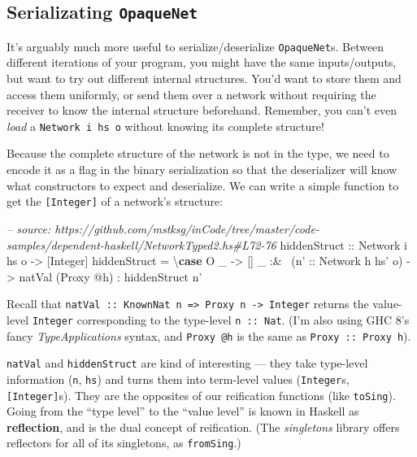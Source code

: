 \documentclass[]{article}
\newenvironment{Shaded}{}{}
\newcommand{\KeywordTok}[1]{\textcolor[rgb]{0.00,0.44,0.13}{\textbf{{#1}}}}
\newcommand{\DataTypeTok}[1]{\textcolor[rgb]{0.56,0.13,0.00}{{#1}}}
\newcommand{\CommentTok}[1]{\textcolor[rgb]{0.38,0.63,0.69}{\textit{{#1}}}}
\newcommand{\OtherTok}[1]{\textcolor[rgb]{0.00,0.44,0.13}{{#1}}}
\newcommand{\FunctionTok}[1]{\textcolor[rgb]{0.02,0.16,0.49}{{#1}}}
\newcommand{\NormalTok}[1]{{#1}}
\begin{document}
\subsection{\texorpdfstring{Serializating
\texttt{OpaqueNet}}{Serializating OpaqueNet}}\label{serializating-opaquenet}

It's arguably much more useful to serialize/deserialize \texttt{OpaqueNet}s.
Between different iterations of your program, you might have the same
inputs/outputs, but want to try out different internal structures. You'd want to
store them and access them uniformly, or send them over a network without
requiring the receiver to know the internal structure beforehand. Remember, you
can't even \emph{load} a \texttt{Network\ i\ hs\ o} without knowing its complete
structure!

Because the complete structure of the network is not in the type, we need to
encode it as a flag in the binary serialization so that the deserializer will
know what constructors to expect and deserialize. We can write a simple function
to get the \texttt{{[}Integer{]}} of a network's structure:

\begin{Shaded}
\begin{Highlighting}[]
\CommentTok{-- source: https://github.com/mstksg/inCode/tree/master/code-samples/dependent-haskell/NetworkTyped2.hs#L72-76}
\OtherTok{hiddenStruct ::} \DataTypeTok{Network} \NormalTok{i hs o }\OtherTok{->} \NormalTok{[}\DataTypeTok{Integer}\NormalTok{]}
\NormalTok{hiddenStruct }\FunctionTok{=} \NormalTok{\textbackslash{}}\KeywordTok{case} \DataTypeTok{O} \NormalTok{_    }\OtherTok{->} \NormalTok{[]}
                     \NormalTok{_ }\FunctionTok{:&~} \NormalTok{(}\OtherTok{n' ::} \DataTypeTok{Network} \NormalTok{h hs' o)}
                            \OtherTok{->} \NormalTok{natVal (}\DataTypeTok{Proxy} \FunctionTok{@}\NormalTok{h)}
                             \FunctionTok{:} \NormalTok{hiddenStruct n'}
\end{Highlighting}
\end{Shaded}

Recall that
\texttt{natVal\ ::\ KnownNat\ n\ =\textgreater{}\ Proxy\ n\ -\textgreater{}\ Integer}
returns the value-level \texttt{Integer} corresponding to the type-level
\texttt{n\ ::\ Nat}. (I'm also using GHC 8's fancy \emph{TypeApplications}
syntax, and \texttt{Proxy\ @h} is the same as \texttt{Proxy\ ::\ Proxy\ h}).

\texttt{natVal} and \texttt{hiddenStruct} are kind of interesting --- they take
type-level information (\texttt{n}, \texttt{hs}) and turns them into term-level
values (\texttt{Integer}s, \texttt{{[}Integer{]}}s). They are the opposites of
our reification functions (like \texttt{toSing}). Going from the ``type level''
to the ``value level'' is known in Haskell as \textbf{reflection}, and is the
dual concept of reification. (The \emph{singletons} library offers reflectors
for all of its singletons, as \texttt{fromSing}.)
\end{document}
